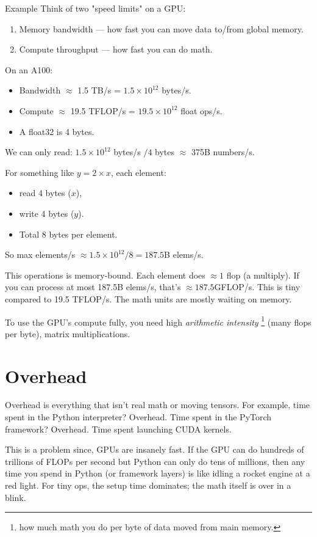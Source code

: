 \begin{commentbox}{Example}
Think of two "speed limits" on a GPU:
\begin{enumerate}
	\item Memory bandwidth — how fast you can move data to/from global memory.
 	\item Compute throughput — how fast you can do math.
\end{enumerate}

On an A100:
\begin{itemize}
	\item Bandwidth $\approx$ 1.5 TB/s = $1.5\times 10^{12}$ bytes/s.
	\item Compute $\approx$ 19.5 TFLOP/s = $19.5\times 10^{12}$ float ops/s.
	\item A float32 is 4 bytes.
\end{itemize}

We can only read: $1.5\times 10^{12}$ bytes/s $/ 4$ bytes $\approx$ 375B numbers/s.

For something like $y = 2\times x$, each element:
\begin{itemize}
	\item  read 4 bytes ($x$),
	\item  write 4 bytes ($y$).
	\item Total 8 bytes per element.
\end{itemize}
So max elements/s $\approx 1.5\times 10^{12} / 8 = 187.5$B elems/s.

This operations is memory-bound. Each element does $\approx 1$ flop (a multiply). If you can process at most 187.5B elems/s, that's $\approx 187.5 $GFLOP/s. This is tiny compared to 19.5 TFLOP/s. The math units are mostly waiting on memory.

To use the GPU's compute fully, you need high \textit{arithmetic intensity} \footnote{how much math you do per byte of data moved from main memory.} (many flops per byte), \eg matrix multiplications.
\end{commentbox}


\section{Overhead}

Overhead is everything that isn't real math or moving tensors. For example, time spent in the Python interpreter? Overhead. Time spent in the PyTorch framework? Overhead. Time spent launching CUDA kernels.

This is a problem since, GPUs are insanely fast. If the GPU can do hundreds of trillions of FLOPs per second but Python can only do tens of millions, then any time you spend in Python (or framework layers) is like idling a rocket engine at a red light. For tiny ops, the setup time dominates; the math itself is over in a blink.

